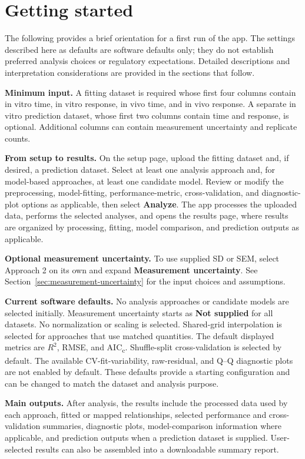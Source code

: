 \section{Getting started}

The following provides a brief orientation for a first run of the app. The settings described here as defaults are software defaults only; they do not establish preferred analysis choices or regulatory expectations. Detailed descriptions and interpretation considerations are provided in the sections that follow.

\textbf{Minimum input.} A fitting dataset is required whose first four columns contain in vitro time, in vitro response, in vivo time, and in vivo response. A separate in vitro prediction dataset, whose first two columns contain time and response, is optional. Additional columns can contain measurement uncertainty and replicate counts.

\textbf{From setup to results.} On the setup page, upload the fitting dataset and, if desired, a prediction dataset. Select at least one analysis approach and, for model-based approaches, at least one candidate model. Review or modify the preprocessing, model-fitting, performance-metric, cross-validation, and diagnostic-plot options as applicable, then select \textbf{Analyze}. The app processes the uploaded data, performs the selected analyses, and opens the results page, where results are organized by processing, fitting, model comparison, and prediction outputs as applicable.

\textbf{Optional measurement uncertainty.} To use supplied SD or SEM, select Approach 2 on its own and expand \textbf{Measurement uncertainty}. See Section~\ref{sec:measurement-uncertainty} for the input choices and assumptions.

\textbf{Current software defaults.} No analysis approaches or candidate models are selected initially. Measurement uncertainty starts as \textbf{Not supplied} for all datasets. No normalization or scaling is selected. Shared-grid interpolation is selected for approaches that use matched quantities. The default displayed metrics are $R^2$, RMSE, and AIC\textsubscript{c}. Shuffle-split cross-validation is selected by default. The available CV-fit-variability, raw-residual, and Q--Q diagnostic plots are not enabled by default. These defaults provide a starting configuration and can be changed to match the dataset and analysis purpose.

\textbf{Main outputs.} After analysis, the results include the processed data used by each approach, fitted or mapped relationships, selected performance and cross-validation summaries, diagnostic plots, model-comparison information where applicable, and prediction outputs when a prediction dataset is supplied. User-selected results can also be assembled into a downloadable summary report.



